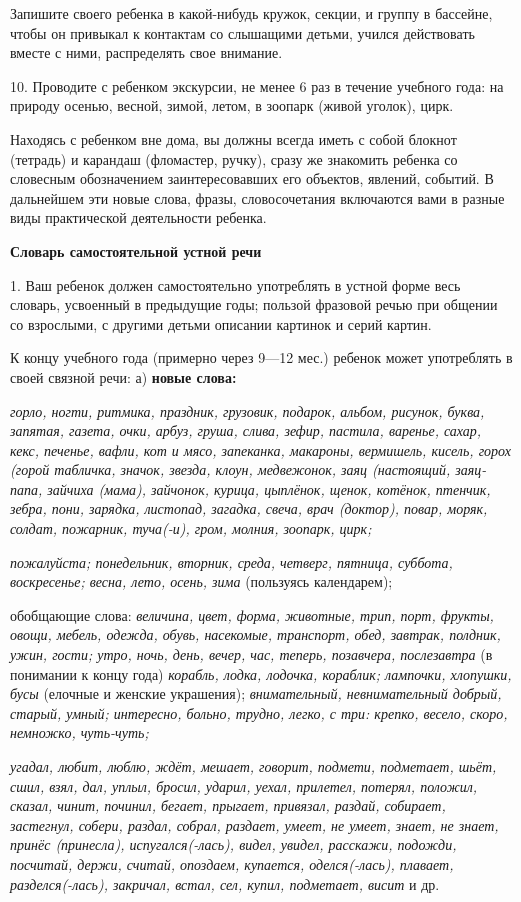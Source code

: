 \documentclass{book}
\renewcommand{\emph}[1]{\textit{#1}}
\begin{document}
Запишите своего ребенка в какой-нибудь кружок, секции, и группу в
бассейне, чтобы он привыкал к контактам со слышащими детьми, учился
действовать вместе с ними, распределять свое внимание.

10. Проводите с ребенком экскурсии, не менее 6 раз в течение учебного
года: на природу осенью, весной, зимой, летом, в зоопарк (живой уголок),
цирк.

Находясь с ребенком вне дома, вы должны всегда иметь с собой блокнот
(тетрадь) и карандаш (фломастер, ручку), сразу же знакомить ребенка со
словесным обозначением заинтересовавших его объектов, явлений, событий.
В дальнейшем эти новые слова, фразы, словосочетания включаются вами в
разные виды практической деятельности ребенка.

\textbf{Словарь самостоятельной устной речи}

1. Ваш ребенок должен самостоятельно употреблять в устной форме весь
словарь, усвоенный в предыдущие годы; пользой фразовой речью при общении
со взрослыми, с другими детьми описании картинок и серий картин.

К концу учебного года (примерно через 9---12 мес.) ребенок может
употреблять в своей связной речи: а) \textbf{новые слова:}

\emph{горло, ногти, ритмика, праздник, грузовик, подарок, альбом,
рисунок, буква, запятая, газета, очки, арбуз, груша, слива, зефир,
пастила, варенье, сахар, кекс, печенье, вафли, кот и мясо, запеканка,
макароны, вермишель, кисель, горох (горой табличка, значок, звезда,
клоун, медвежонок, заяц (настоящий, заяц-папа, зайчиха (мама), зайчонок,
курица, цыплёнок, щенок, котёнок, птенчик, зебра, пони, зарядка,
листопад, загадка, свеча, врач (доктор), повар, моряк, солдат, пожарник,
туча(-и), гром, молния, зоопарк, цирк;}

\emph{пожалуйста; понедельник, вторник, среда, четверг, пятница,
суббота, воскресенье; весна, лето, осень, зима} (пользуясь календарем);

обобщающие слова: \emph{величина, цвет, форма, животные, трип, порт,
фрукты, овощи, мебель, одежда, обувь, насекомые, транспорт, обед,
завтрак, полдник, ужин, гости; утро, ночь, день, вечер, час, теперь,
позавчера, послезавтра} (в понимании к концу года) \emph{корабль, лодка,
лодочка, кораблик; лампочки, хлопушки, бусы} (елочные и женские
украшения); \emph{внимательный, невнимательный добрый, старый, умный;
интересно, больно, трудно, легко, с три: крепко, весело, скоро,
немножко, чуть-чуть;}

\emph{угадал, любит, люблю, ждёт, мешает, говорит, подмети, подметает,
шьёт, сшил, взял, дал, уплыл, бросил, ударил, уехал, прилетел, потерял,
положил, сказал, чинит, починил, бегает, прыгает, привязал, раздай,
собирает, застегнул, собери, раздал, собрал, раздает, умеет, не умеет,
знает, не знает, принёс (принесла), испугался(-лась), видел, увидел,
расскажи, подожди, посчитай, держи, считай, опоздаем, купается,
оделся(-лась), плавает, разделся(-лась), закричал, встал, сел, купил,
подметает, висит} и др.
\end{document}
